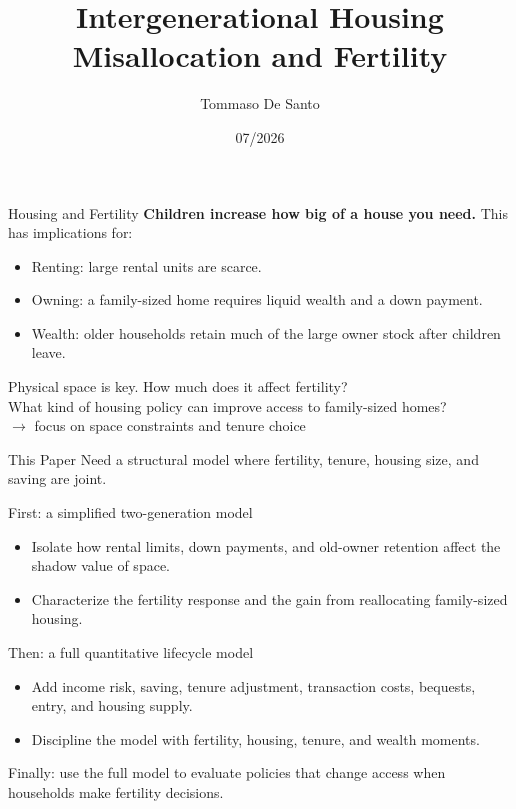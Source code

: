 \documentclass[aspectratio=169,11pt]{beamer}
\title{Intergenerational Housing Misallocation and Fertility}
\author{Tommaso De Santo}
\date{07/2026}
\newcommand{\source}[1]{}
\newcommand{\tightitems}{\setlength{\itemsep}{0.55em}}
\newcommand{\1}{\mathbf 1}
\begin{document}
{\maketitle}

\begin{frame}{Housing and Fertility}
  \textbf{Children increase how big of a house you need.} This has implications for:
  \begin{itemize}\tightitems
    \item Renting: large rental units are scarce.
    \item Owning: a family-sized home requires liquid wealth and a down payment.
    \item Wealth: older households retain much of the large owner stock after children leave.
  \end{itemize}

  \vfill
  Physical space is key. How much does it affect fertility?\\
  What kind of housing policy can improve access to family-sized homes?\\[0.25em]
  \hspace{2em}$\rightarrow$ focus on space constraints and tenure choice
  \source{Circulated note, Introduction.}
\end{frame}

\begin{frame}{This Paper}
  Need a structural model where fertility, tenure, housing size, and saving are joint.

  \vfill
  \alert{First:} a simplified two-generation model
  \begin{itemize}\tightitems
    \item Isolate how rental limits, down payments, and old-owner retention affect the shadow value of space.
    \item Characterize the fertility response and the gain from reallocating family-sized housing.
  \end{itemize}

  \vfill
  \alert{Then:} a full quantitative lifecycle model
  \begin{itemize}\tightitems
    \item Add income risk, saving, tenure adjustment, transaction costs, bequests, entry, and housing supply.
    \item Discipline the model with fertility, housing, tenure, and wealth moments.
  \end{itemize}

  \vfill
  \alert{Finally:} use the full model to evaluate policies that change access when households make fertility decisions.
  \source{Circulated note, Introduction and status of the draft.}
\end{frame}
\end{document}
